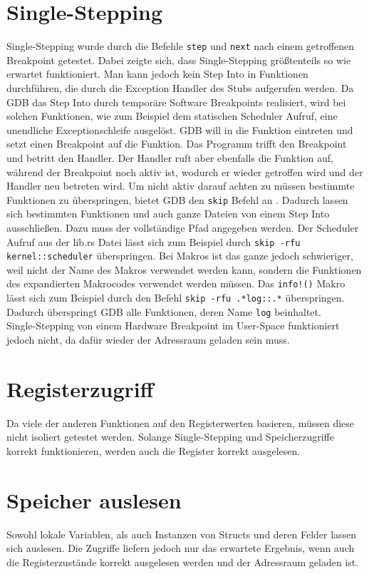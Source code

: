 \section{Single-Stepping}
Single-Stepping wurde durch die Befehle \texttt{step} und \texttt{next} nach einem getroffenen Breakpoint getestet. Dabei zeigte sich, dass Single-Stepping größtenteils so wie erwartet funktioniert. Man kann jedoch kein Step Into in Funktionen durchführen, die durch die Exception Handler des Stubs aufgerufen werden. Da GDB das Step Into durch temporäre Software Breakpoints realisiert, wird bei solchen Funktionen, wie zum Beispiel dem statischen Scheduler Aufruf, eine unendliche Exceptionschleife ausgelöst. GDB will in die Funktion eintreten und setzt einen Breakpoint auf die Funktion. Das Programm trifft den Breakpoint und betritt den Handler. Der Handler ruft aber ebenfalls die Funktion auf, während der Breakpoint noch aktiv ist, wodurch er wieder getroffen wird und der Handler neu betreten wird. Um nicht aktiv darauf achten zu müssen bestimmte Funktionen zu überspringen, bietet GDB den \texttt{skip} Befehl an \cite{gdb}. Dadurch lassen sich bestimmten Funktionen und auch ganze Dateien von einem Step Into ausschließen. Dazu muss der vollständige Pfad angegeben werden. Der Scheduler Aufruf aus der lib.rs Datei lässt sich zum Beispiel durch \texttt{skip -rfu kernel::scheduler} überspringen. Bei Makros ist das ganze jedoch schwieriger, weil nicht der Name des Makros verwendet werden kann, sondern die Funktionen des expandierten Makrocodes verwendet werden müssen. Das \texttt{info!()} Makro lässt sich zum Beispiel durch den Befehl \texttt{skip -rfu .*log::.*} überspringen. Dadurch überspringt GDB alle Funktionen, deren Name \texttt{log} beinhaltet.\\
Single-Stepping von einem Hardware Breakpoint im User-Space funktioniert jedoch nicht, da dafür wieder der Adressraum geladen sein muss.

\section{Registerzugriff}
Da viele der anderen Funktionen auf den Registerwerten basieren, müssen diese nicht isoliert getestet werden. Solange Single-Stepping und Speicherzugriffe korrekt funktionieren, werden auch die Register korrekt ausgelesen.

\section{Speicher auslesen}
Sowohl lokale Variablen, als auch Instanzen von Structs und deren Felder lassen sich auslesen. Die Zugriffe liefern jedoch nur das erwartete Ergebnis, wenn auch die Registerzustände korrekt ausgelesen werden und der Adressraum geladen ist. 


